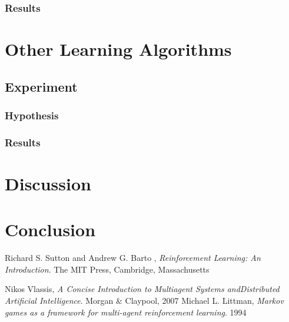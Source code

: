 \documentclass[a4paper,10pt]{article}
\begin{document}
\subsubsection{Results}










\section{Other Learning Algorithms}



\subsection{Experiment}



\subsubsection{Hypothesis}


\subsubsection{Results}







\section{Discussion}



\section{Conclusion}


\begin{thebibliography}{2}

  Richard S. Sutton and Andrew G. Barto ,
  \emph{Reinforcement Learning: An Introduction}.
  The MIT Press, Cambridge, Massachusetts


  Nikos Vlassis,
  \emph{A Concise Introduction to Multiagent Systems andDistributed Artificial Intelligence}.
  Morgan \& Claypool, 2007
  Michael L. Littman,
  \emph{Markov games as a framework for multi-agent reinforcement learning}.
  1994

\end{thebibliography}
\end{document}

